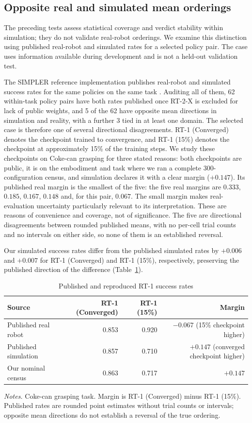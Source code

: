 \documentclass[pdflatex,iicol,sn-apa]{sn-jnl}
\theoremstyle{remark}
\newcommand{\tablenote}[1]{\par\vspace{4pt}\noindent
\begin{minipage}{\linewidth}\tablefootnotefont\raggedright #1\par\end{minipage}}
\begin{document}
\subsection{Opposite real and simulated mean orderings}\label{subsec8_4}

The preceding tests assess statistical coverage and verdict stability within simulation;
they do not validate real-robot orderings. We examine this distinction using published
real-robot and simulated rates for a selected policy pair. The case uses information available
during development and is not a held-out validation test.

The SIMPLER reference implementation publishes real-robot and simulated success rates for the
same policies on the same task \citep{li2024simpler}. Auditing all of them, 62
within-task policy pairs have both rates published once RT-2-X is excluded for lack of public
weights, and 5 of the 62 have opposite mean directions in simulation and reality, with a
further 3 tied in at least one domain. The selected case is therefore one of several directional disagreements. RT-1 (Converged) denotes the checkpoint trained to convergence, and RT-1 (15\%) denotes the checkpoint at approximately 15\% of the training steps. We study these checkpoints on
Coke-can grasping for three stated reasons: both checkpoints are public, it is on
the embodiment and task where we ran a complete 300-configuration census, and simulation declares it
with a clear margin ($+0.147$). Its published real margin is the smallest of the five: the five real margins are $0.333$,
$0.185$, $0.167$, $0.148$ and, for this pair, $0.067$. The small margin makes real-evaluation uncertainty particularly relevant to its interpretation. These are reasons of convenience
and coverage, not of significance. The
five are directional disagreements between rounded published means, with no per-cell trial
counts and no intervals on either side, so none of them is an established reversal.

Our simulated success rates differ from the published simulated rates by $+0.006$ and $+0.007$ for RT-1 (Converged) and RT-1 (15\%), respectively, preserving the published direction of the difference (Table~\ref{tab9}).

\begin{table}[t]
\caption{Published and reproduced RT-1 success rates}\label{tab9}
\begin{tabular}{@{}lrrr@{}}
\toprule
Source & RT-1 (Converged) & RT-1 (15\%) & Margin \\
\midrule
Published real robot & 0.853 & 0.920 & $-0.067$ (15\% checkpoint higher) \\
Published simulation & 0.857 & 0.710 & $+0.147$ (converged checkpoint higher) \\
Our nominal census & 0.863 & 0.717 & $+0.147$ \\
\bottomrule
\end{tabular}
\tablenote{\textit{Notes.} Coke-can grasping task. Margin is RT-1 (Converged) minus RT-1 (15\%). Published rates are rounded point estimates without trial counts or intervals; opposite mean directions do not establish a reversal of the true ordering.}
\end{table}
\end{document}
